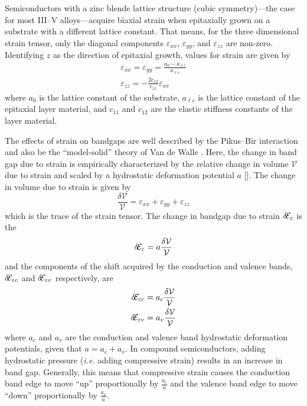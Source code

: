 \documentclass[12pt]{report}
\begin{document}
Semiconductors with a zinc blende lattice structure (cubic symmetry)---the case for most III--V alloys---acquire biaxial strain when epitaxially grown on a substrate with a different lattice constant.  That means, for the three dimensional strain tensor, only the diagonal components $\varepsilon_{xx}$, $\varepsilon_{yy}$, and $\varepsilon_{zz}$ are non-zero.  Identifying $z$ as the direction of epitaxial growth, values for strain are given by \cite{Chuang}
\begin{subequations}
\begin{gather}
\varepsilon_{xx} = \varepsilon_{yy} = \frac{a_0 - a_{\ell c}}{a_{\ell c}}\\
\varepsilon_{zz} = -\frac{2 c_{12}}{c_{11}} \varepsilon_{xx}
\end{gather}
\end{subequations}
where $a_0$ is the lattice constant of the substrate, $a_{\ell c}$ is the lattice constant of the epitaxial layer material, and $c_{11}$ and $c_{12}$ are the elastic stiffness constants of the layer material.

The effects of strain on bandgaps are well described by the Pikus--Bir interaction \cite{Pikus-Bir} and also be the ``model-solid'' theory of Van de Walle \cite{VandeWalle:PRB:1989}.  Here, the change in band gap due to strain is empirically characterized by the relative change in volume $\mathcal{V}$ due to strain and scaled by a hydrostatic deformation potential $a$ [].  The change in volume due to strain is given by
\begin{equation}
\frac{\delta \mathcal{V}}{\mathcal{V}} = \varepsilon_{xx}+\varepsilon_{yy}+\varepsilon_{zz}
\end{equation}
which is the trace of the strain tensor.  The change in bandgap due to strain $\delta\!\EE_\varepsilon$ is the
\begin{equation}
\delta\!\EE_\varepsilon = a \frac{\delta \mathcal{V}}{\mathcal{V}}
\end{equation}
and the components of the shift acquired by the conduction and valence bands, $\delta\!\EE_{\varepsilon c}$ and $\delta\!\EE_{\varepsilon v}$ respectively, are
\begin{subequations}
\begin{gather}
\delta\!\EE_{\varepsilon c} = a_c \frac{\delta \mathcal{V}}{\mathcal{V}}\\
\delta\!\EE_{\varepsilon v} = a_v \frac{\delta \mathcal{V}}{\mathcal{V}}
\end{gather}
\end{subequations}
where $a_c$ and $a_v$ are the conduction and valence band hydrostatic deformation potentials, given that $a=a_c+a_v$.  In compound semiconductors, adding hydrostatic pressure (\emph{i.e.} adding compressive strain) results in an increase in band gap.  Generally, this means that compressive strain causes the conduction band edge to move ``up'' proportionally by $\frac{a_c}{a}$ and the valence band edge to move ``down'' proportionally by $\frac{a_v}{a}$.
\end{document}
